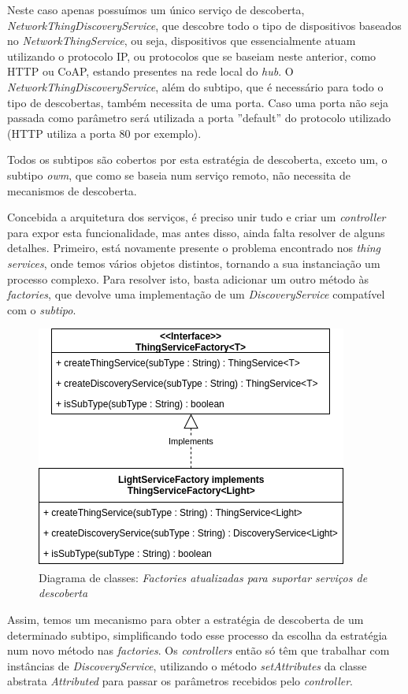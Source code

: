 Neste caso apenas possuímos um único serviço de descoberta, \textit{NetworkThingDiscoveryService}, que descobre todo o tipo de dispositivos baseados no \textit{NetworkThingService}, ou seja, dispositivos que essencialmente atuam utilizando o protocolo IP, ou protocolos que se baseiam neste anterior, como HTTP ou CoAP, estando presentes na rede local do \textit{hub}. O \textit{NetworkThingDiscoveryService}, além do subtipo, que é necessário para todo o tipo de descobertas, também necessita de uma porta. Caso uma porta não seja passada como parâmetro será utilizada a porta ''default'' do protocolo utilizado (HTTP utiliza a porta 80 por exemplo).

Todos os subtipos são cobertos por esta estratégia de descoberta, exceto um, o subtipo \textit{owm}, que como se baseia num serviço remoto, não necessita de mecanismos de descoberta.

Concebida a arquitetura dos serviços, é preciso unir tudo e criar um \textit{controller} para expor esta funcionalidade, mas antes disso, ainda falta resolver de alguns detalhes. Primeiro, está novamente presente o problema encontrado nos \textit{thing services}, onde temos vários objetos distintos, tornando a sua instanciação um processo complexo. Para resolver isto, basta adicionar um outro método às \textit{factories}, que devolve uma implementação de um \textit{DiscoveryService} compatível com o \textit{subtipo}.

\begin{figure}[H]
  \centering
        \includegraphics[scale=0.6]{img/hub-factories-discovery.png}
  \caption{Diagrama de classes: \textit{Factories atualizadas para suportar serviços de descoberta}}
\end{figure}

Assim, temos um mecanismo para obter a estratégia de descoberta de um determinado subtipo, simplificando todo esse processo da escolha da estratégia num novo método nas \textit{factories}. Os \textit{controllers} então só têm que trabalhar com instâncias de \textit{DiscoveryService}, utilizando o método \textit{setAttributes} da classe abstrata \textit{Attributed} para passar os parâmetros recebidos pelo \textit{controller}.


